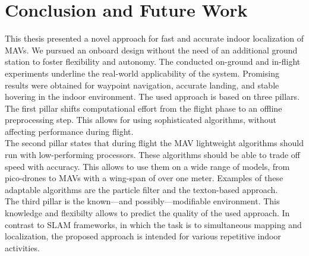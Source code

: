\chapter{Conclusion and Future Work}
\label{chap:conclusion}

This thesis presented a novel approach for fast and accurate indoor
localization of MAVs. We pursued an onboard design without the need of
an additional ground station to foster flexibility and autonomy. The
conducted on-ground and in-flight experiments underline the real-world
applicability of the system. Promising results were obtained for
waypoint navigation, accurate landing, and stable hovering in the
indoor environment. The
used approach is based on three pillars.\\
The first pillar shifts computational effort from the flight phase to
an offline preprocessing step. This allows for using sophisticated
algorithms, without affecting performance during flight.\\
The second pillar states that during flight the MAV lightweight
algorithms should run with low-performing processors. These algorithms
should be able to trade off speed with accuracy. This allows to use
them on a wide range of models, from pico-drones to MAVs with a
wing-span of over one meter. Examples of these adaptable algorithms
are the particle filter
and the texton-based approach. \\
The third pillar is the known---and possibly---modifiable
environment. This knowledge and flexibilty allows to predict the
quality of the used approach. In contrast to SLAM frameworks, in which
the task is to simultaneous mapping and localization, the proposed
approach is intended for various repetitive indoor activities.
